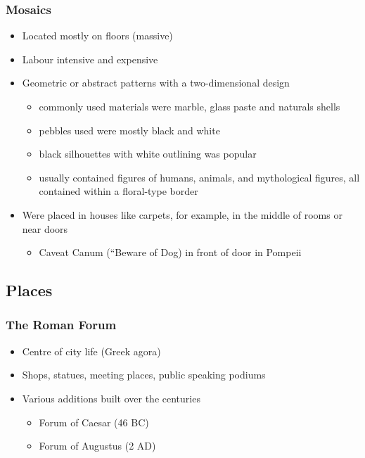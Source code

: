 \documentclass[12pt, twoside]{article}
\begin{document}
\subsubsection{Mosaics}
\begin{itemize}
\item Located mostly on floors (massive)
\item Labour intensive and expensive
\item Geometric or abstract patterns with a two-dimensional design
	\begin{itemize}
	\item commonly used materials were marble, glass paste and naturals shells
	\item pebbles used were mostly black and white
	\item black silhouettes with white outlining was popular
	\item usually contained figures of humans, animals,  and mythological figures, all contained within a floral-type border
	\end{itemize}
\item Were placed in houses like carpets, for example, in the middle of rooms or near doors
	\begin{itemize}
	\item Caveat Canum (“Beware of Dog) in front of door in Pompeii
	\end{itemize}
\end{itemize}

\subsection{Places}
\subsubsection{The Roman Forum}
\begin{itemize}
\item Centre of city life (Greek agora)
\item Shops, statues, meeting places, public speaking podiums
\item Various additions built over the centuries
	\begin{itemize}
	\item Forum of Caesar (46 BC)
	\item Forum of Augustus (2 AD)
	\end{itemize}
\end{itemize}
\end{document}
